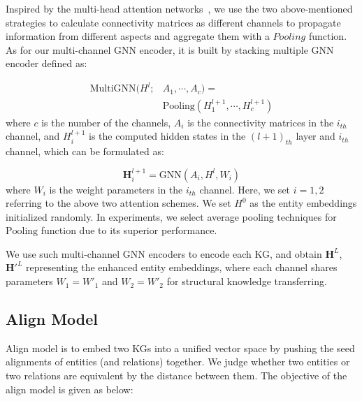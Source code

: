 \documentclass[11pt,a4paper]{article}
\begin{document}
Inspired by the multi-head attention networks~\cite{velivckovic2018graph}, we use the two above-mentioned strategies to calculate connectivity matrices as different channels to propagate information from different aspects and aggregate them with a $Pooling$ function. As for our multi-channel GNN encoder, it is built by stacking multiple GNN encoder defined as:

\begin{equation} \label{eq:gat}
	\begin{split}
		\text{MultiGNN}(H^l;&A_1,\cdots,A_c)= \\
		&\text{Pooling}(H^{l+1}_1,\cdots,H^{l+1}_c)
	\end{split}
\end{equation}
where $c$ is the number of the channels, $A_i$ is the connectivity matrices in the $i_{th}$ channel, and $H^{l+1}_i$ is the computed hidden states in the $(l+1)_{th}$ layer and $i_{th}$ channel, which can be formulated as:

\begin{equation} \label{eq:gat}
	\mathbf{H}^{l+1}_i = \text{GNN}(A_i,H^l,W_i)
\end{equation}
where $W_i$ is the weight parameters in the $i_{th}$ channel. Here, we set $i=1,2$ referring to the above two attention schemes. We set $H^0$ as the entity embeddings initialized randomly. In experiments, we select average pooling techniques for $\text{Pooling}$ function due to its superior performance.

We use such multi-channel GNN encoders to encode each KG, and obtain $\mathbf{H}^L$, $\mathbf{H}'^L$ representing the enhanced entity embeddings, where each channel shares parameters $W_1=W'_1$ and $W_2=W'_2$ for structural knowledge transferring.

\subsection{Align Model}
Align model is to embed two KGs into a unified vector space by pushing the seed alignments of entities (and relations) together. We judge whether two entities or two relations are equivalent by the distance between them. The objective of the align model is given as below:
\end{document}
